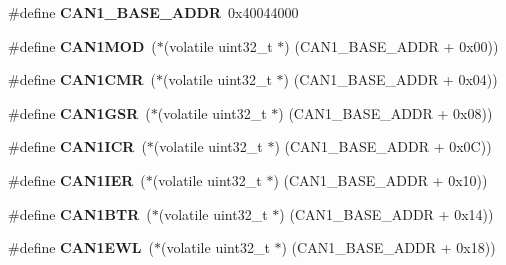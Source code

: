 \begin{DoxyCompactItemize}
\item 
\mbox{\label{group__lpc24xx__regs_ga3bcddabab65750a963da37f3d6b86c05}} 
\#define {\bfseries C\+A\+N1\+\_\+\+B\+A\+S\+E\+\_\+\+A\+D\+DR}~0x40044000
\item 
\mbox{\label{group__lpc24xx__regs_ga38f8437047c7c1e2caafc0061f965864}} 
\#define {\bfseries C\+A\+N1\+M\+OD}~($\ast$(volatile uint32\+\_\+t $\ast$) (C\+A\+N1\+\_\+\+B\+A\+S\+E\+\_\+\+A\+D\+DR + 0x00))
\item 
\mbox{\label{group__lpc24xx__regs_gab95ed7a71e1cb3af07e30dcb2c7034af}} 
\#define {\bfseries C\+A\+N1\+C\+MR}~($\ast$(volatile uint32\+\_\+t $\ast$) (C\+A\+N1\+\_\+\+B\+A\+S\+E\+\_\+\+A\+D\+DR + 0x04))
\item 
\mbox{\label{group__lpc24xx__regs_ga37612beb9f7fd8e42b43416a2fedcc92}} 
\#define {\bfseries C\+A\+N1\+G\+SR}~($\ast$(volatile uint32\+\_\+t $\ast$) (C\+A\+N1\+\_\+\+B\+A\+S\+E\+\_\+\+A\+D\+DR + 0x08))
\item 
\mbox{\label{group__lpc24xx__regs_ga9d898bf486894841622eee888988d09a}} 
\#define {\bfseries C\+A\+N1\+I\+CR}~($\ast$(volatile uint32\+\_\+t $\ast$) (C\+A\+N1\+\_\+\+B\+A\+S\+E\+\_\+\+A\+D\+DR + 0x0\+C))
\item 
\mbox{\label{group__lpc24xx__regs_gacce25ce507a7c30638d805aeda891246}} 
\#define {\bfseries C\+A\+N1\+I\+ER}~($\ast$(volatile uint32\+\_\+t $\ast$) (C\+A\+N1\+\_\+\+B\+A\+S\+E\+\_\+\+A\+D\+DR + 0x10))
\item 
\mbox{\label{group__lpc24xx__regs_ga72c6e6ba6feb2e823e4e70a2a3686066}} 
\#define {\bfseries C\+A\+N1\+B\+TR}~($\ast$(volatile uint32\+\_\+t $\ast$) (C\+A\+N1\+\_\+\+B\+A\+S\+E\+\_\+\+A\+D\+DR + 0x14))
\item 
\mbox{\label{group__lpc24xx__regs_gab20a457fb4657c2f711ab5181230eeae}} 
\#define {\bfseries C\+A\+N1\+E\+WL}~($\ast$(volatile uint32\+\_\+t $\ast$) (C\+A\+N1\+\_\+\+B\+A\+S\+E\+\_\+\+A\+D\+DR + 0x18))
\item 
\mbox{\label{group__lpc24xx__regs_ga8ddbbf283c93c7efdfa3a3f18f27ba32}} 

\end{DoxyCompactItemize}
